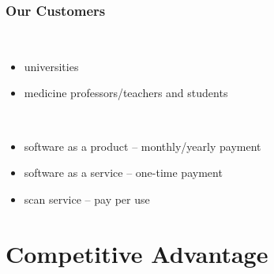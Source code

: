 \begin{frame}
  \frametitle{Our Customers}
      \begin{description}[]
        \item[Profile] \hfill \\
        \begin{itemize}
          \item universities
          \item medicine professors/teachers and students
        \end{itemize}

        \bigskip
        \item[Cost plan] \hfill \\
          \begin{itemize}
            \item software as a product -- monthly/yearly payment
            \item software as a service -- one-time payment
            \item scan service -- pay per use
        \end{itemize}
      \end{description}

\end{frame}

\section{Competitive Advantage}

